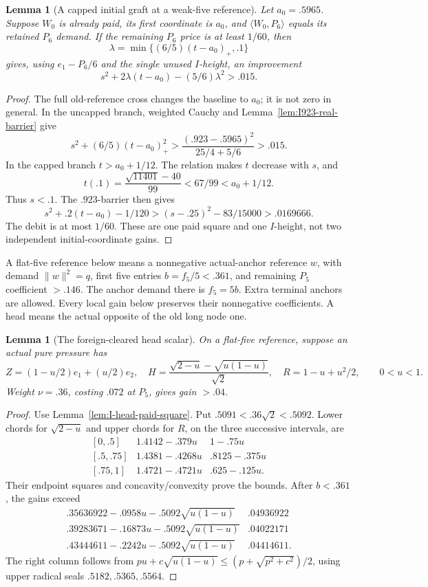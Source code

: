 \documentclass[11pt]{article}
\newtheorem{lemma}[theorem]{Lemma}
\theoremstyle{definition}
\theoremstyle{remark}
\newcommand{\ip}[2]{\langle #1,#2\rangle}
\newcommand{\norm}[1]{\lVert #1\rVert}
\begin{document}
\begin{lemma}[A capped initial graft at a weak-five reference]
\label{lem:I-capped-initial-graft}
Let \(a_0=.5965\). Suppose \(W_0\) is already paid, its first
coordinate is \(a_0\), and \(\ip{W_0}{P_6}\) equals its retained
\(P_6\) demand. If the remaining \(P_6\) price is at least \(1/60\),
then
\[
 \lambda=\min\{(6/5)(t-a_0)_+,.1\}
\]
gives, using \(e_1-P_6/6\) and the single unused \(I\)-height,
an improvement
\[
 s^2+2\lambda(t-a_0)-(5/6)\lambda^2>.015.
\]
\end{lemma}
\begin{proof}
The full old-reference cross changes the baseline to \(a_0\);
it is not zero in general. In the uncapped branch, weighted Cauchy
and Lemma~\ref{lem:I923-real-barrier} give
\[
 s^2+(6/5)(t-a_0)_+^2>
 {\frac{(.923-.5965)^2}{25/4+5/6}}>.015.
\]
In the capped branch \(t>a_0+1/12\). The relation makes \(t\)
decrease with \(s\), and
\[
 t(.1)={\frac{\sqrt{11401}-40}{99}}<67/99<a_0+1/12.
\]
Thus \(s<.1\). The \(.923\)-barrier then gives
\[
 s^2+.2(t-a_0)-1/120>
 (s-.25)^2-83/15000>.0169666.
\]
The debit is at most \(1/60\). These are one paid square and one
\(I\)-height, not two independent initial-coordinate gains.
\end{proof}

A flat-five reference below means a nonnegative actual-anchor reference
\(w\), with demand \(\norm w^2=q\), first five entries
\(b=f_5/5<.361\), and remaining \(P_5\) coefficient \(>.146\).
The anchor demand there is \(f_5=5b\). Extra terminal anchors are allowed.
Every local gain below preserves their nonnegative coefficients.
A head means the actual opposite of the old long node one.

\begin{lemma}[The foreign-cleared head scalar]
\label{lem:I-cleared-head-flat-gain}
On a flat-five reference, suppose an actual pure pressure has
\[
 Z=(1-u/2)e_1+(u/2)e_2,\quad
 H={\frac{\sqrt{2-u}-\sqrt{u(1-u)}}{\sqrt2}},\quad
 R=1-u+u^2/2,\qquad 0<u<1.
\]
Weight \(\nu=.36\), costing \(.072\) at \(P_5\), gives gain \(>.04\).
\end{lemma}
\begin{proof}
Use Lemma~\ref{lem:I-head-paid-square}. Put
\(.5091<.36\sqrt2<.5092\). Lower chords for \(\sqrt{2-u}\)
and upper chords for \(R\), on the three successive intervals, are
\[
\begin{array}{c|c|c}
{}[0,.5]&1.4142-.379u&1-.75u\\
{}[.5,.75]&1.4381-.4268u&.8125-.375u\\
{}[.75,1]&1.4721-.4721u&.625-.125u.
\end{array}
\]
Their endpoint squares and concavity/convexity prove the bounds.
After \(b<.361\), the gains exceed
\[
\begin{array}{c|c}
.35636922-.0958u-.5092\sqrt{u(1-u)}&.04936922\\
.39283671-.16873u-.5092\sqrt{u(1-u)}&.04022171\\
.43444611-.2242u-.5092\sqrt{u(1-u)}&.04414611.
\end{array}
\]
The right column follows from
\(pu+c\sqrt{u(1-u)}\le(p+\sqrt{p^2+c^2})/2\),
using upper radical seals \(.5182,.5365,.5564\).
\end{proof}
\end{document}

